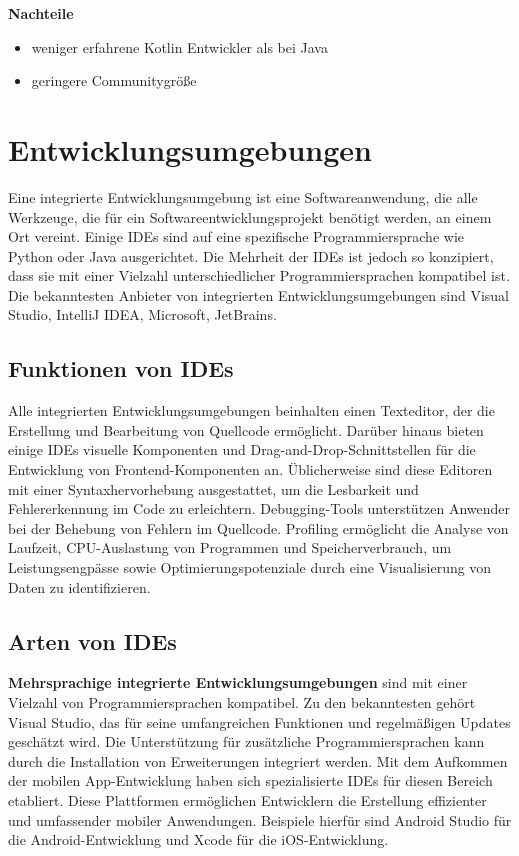 \textbf{Nachteile}
\begin{itemize}
	\item weniger erfahrene Kotlin Entwickler als bei Java
	\item geringere Communitygröße
\end{itemize}


\section{Entwicklungsumgebungen}
Eine integrierte Entwicklungsumgebung ist eine Softwareanwendung, die alle Werkzeuge, die für ein Softwareentwicklungsprojekt benötigt werden, an einem Ort vereint. Einige IDEs sind auf eine spezifische Programmiersprache wie Python oder Java ausgerichtet. Die Mehrheit der IDEs ist jedoch so konzipiert, dass sie mit einer Vielzahl unterschiedlicher Programmiersprachen kompatibel ist. Die bekanntesten Anbieter von integrierten Entwicklungsumgebungen sind Visual Studio, IntelliJ IDEA, Microsoft, JetBrains. 

\subsection{Funktionen von IDEs}
Alle integrierten Entwicklungsumgebungen beinhalten einen Texteditor, der die Erstellung und Bearbeitung von Quellcode ermöglicht. Darüber hinaus bieten einige IDEs visuelle Komponenten und Drag-and-Drop-Schnittstellen für die Entwicklung von Frontend-Komponenten an. Üblicherweise sind diese Editoren mit einer Syntaxhervorhebung ausgestattet, um die Lesbarkeit und Fehlererkennung im Code zu erleichtern. Debugging-Tools unterstützen Anwender bei der Behebung von Fehlern im Quellcode. Profiling ermöglicht die Analyse von Laufzeit, CPU-Auslastung von Programmen und Speicherverbrauch, um Leistungsengpässe sowie Optimierungspotenziale durch eine Visualisierung von Daten zu identifizieren. 

\subsection{Arten von IDEs}
\textbf{Mehrsprachige integrierte Entwicklungsumgebungen} sind mit einer Vielzahl von Programmiersprachen kompatibel. Zu den bekanntesten gehört Visual Studio, das für seine umfangreichen Funktionen und regelmäßigen Updates geschätzt wird. Die Unterstützung für zusätzliche Programmiersprachen kann durch die Installation von Erweiterungen integriert werden. Mit dem Aufkommen der mobilen App-Entwicklung haben sich spezialisierte IDEs für diesen Bereich etabliert. Diese Plattformen ermöglichen Entwicklern die Erstellung effizienter und umfassender mobiler Anwendungen. Beispiele hierfür sind Android Studio für die Android-Entwicklung und Xcode für die iOS-Entwicklung.

